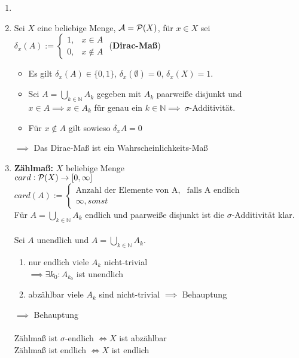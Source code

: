   \begin{example}
    \begin{enumerate}
      \item[]
      \item Sei $X$ eine beliebige Menge, $\mathcal{A} = \mathcal{P}(X)$, für $x \in X$ sei $\delta_x(A) := \begin{cases}1, & x \in A\\0, & x \notin A\end{cases}$ (\textbf{Dirac-Maß})
            \begin{itemize}
              \item Es gilt $\delta_x(A) \in \{0,1\}$, $\delta_x(\emptyset) = 0$, $\delta_x(X) = 1$.
              \item Sei $A = \bigcup\limits_{k \in \mathbb{N}} A_k$ gegeben mit $A_k$ paarweiße disjunkt und $x \in A \implies x \in A_k$ für genau ein $k \in \mathbb{N} \implies\ \sigma$-Additivität.
              \item Für $x \notin A$ gilt sowieso $\delta_x{A} = 0$
            \end{itemize}
            $\implies$ Das Dirac-Maß ist ein Wahrscheinlichkeits-Maß
      \item \textbf{Zählmaß:} $X$ beliebige Menge \\
            $card: \mathcal{P}(X) \to [0, \infty]$\\
            $card(A) := \begin{cases}\text{Anzahl der Elemente von A}, & \text{falls A endlich}\\\infty, sonst\end{cases}$\\
            Für $A = \bigcup\limits_{k\in \mathbb{N}}A_k$ endlich und paarweiße disjunkt ist die $\sigma$-Additivität klar.\\
            \\
            Sei $A$ unendlich und $A = \bigcup\limits_{k\in \mathbb{N}}A_k$.
            \begin{enumerate}
              \item nur endlich viele $A_k$ nicht-trivial\\
                    $\implies \exists k_0: A_{k_0}$ ist unendlich
              \item abzählbar viele $A_k$ sind nicht-trivial $\implies$ Behauptung
            \end{enumerate}
            $\implies$ Behauptung\\
            \\
            Zählmaß ist $\sigma$-endlich $\Leftrightarrow X$ ist abzählbar\\
            Zählmaß ist endlich $\Leftrightarrow X$ ist endlich
    \end{enumerate}
  \end{example}


